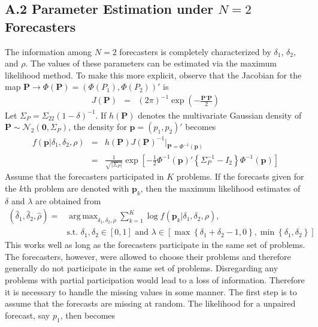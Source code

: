 \documentclass[11pt]{article}
\DeclareMathOperator*{\argmax}{arg\,max}
\theoremstyle{definition}
\theoremstyle{definition}
\begin{document}
\subsection*{A.2 Parameter Estimation under $N=2$ Forecasters}
The information among $N=2$ forecasters is completely characterized by $\delta_1$, $\delta_2$, and $\rho$. The values of these parameters can be estimated via the maximum likelihood method.  To make this more explicit, observe that the Jacobian for the map $\boldsymbol{P} \to \Phi\left(\boldsymbol{P}\right) = (\Phi(P_1), \Phi(P_2))'$ is
\begin{eqnarray*}
J(\boldsymbol{P}) &=& (2\pi)^{-1} \exp \left( - \frac{\boldsymbol{P}' \boldsymbol{P}}{2}   \right) 
\end{eqnarray*}
%
Let $\Sigma_{P} =  \Sigma_{22} (1-\delta)^{-1}$. If $h(\boldsymbol{P})$ denotes the multivariate Gaussian density of $\boldsymbol{P} \sim \mathcal{N}_2\left(\boldsymbol{0}, \Sigma_{P}\right)$,
the density for  $\boldsymbol{p} = (p_1, p_2)'$ becomes
\begin{eqnarray*}
 f\left(\boldsymbol{p} | \delta_1, \delta_2, \rho \right) &=& h(\boldsymbol{P}) J(\boldsymbol{P})^{-1} \bigg|_{\boldsymbol{P} = \Phi^{-1}(\boldsymbol{p})}\\
&=& \frac{1}{\sqrt{ \left|\Sigma_{P}\right|}} \exp\left[ -\frac{1}{2} \Phi^{-1}(\boldsymbol{p})' \left\{\Sigma_{P}^{-1} - I_2 \right\} \Phi^{-1}(\boldsymbol{p})  \right]
\end{eqnarray*}
Assume that the forecasters participated in $K$ problems. If the forecasts given for the $k$th problem are denoted with $\boldsymbol{p}_k$, then the maximum likelihood estimates of $\delta$ and $\lambda$ are obtained from
\begin{align*}
\left(\hat{\delta}_1, \hat{\delta}_2, \hat{\rho}\right) =& \argmax_{\delta_1, \delta_2, \rho} \sum_{k=1}^K \log  f\left(\boldsymbol{p}_k| \delta_1, \delta_2, \rho \right),\\
& \text{s.t. } \nonumber \delta_1, \delta_2 \in [0,1] \text{ and } \lambda \in \left[  \max \left\{\delta_1+\delta_2 - 1,  0\right\}, \min \left\{\delta_1, \delta_2 \right\} \right]
\end{align*}
This works well as long as the forecasters participate in the same set of problems. The forecasters, however, were allowed to choose their problems and therefore generally do not participate in the same set of problems. Disregarding any problems with partial participation would lead to a loss of information. Therefore it is necessary to handle the missing values in some manner. The first step is to assume that the forecasts are missing at random. The likelihood for a unpaired forecast, say $p_1$, then becomes 
\end{document}
